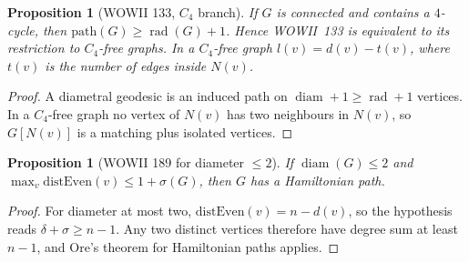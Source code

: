 \documentclass[11pt,a4paper]{article}
\newtheorem{proposition}[theorem]{Proposition}
\theoremstyle{definition}
\newcommand{\rad}{\operatorname{rad}}
\newcommand{\diam}{\operatorname{diam}}
\begin{document}
\begin{proposition}[WOWII 133, $C_4$ branch]
If $G$ is connected and contains a $4$-cycle, then $\mathrm{path}(G)\ge\rad(G)+1$. Hence
WOWII~133 is equivalent to its restriction to $C_4$-free graphs. In a $C_4$-free graph
$l(v)=d(v)-t(v)$, where $t(v)$ is the number of edges inside $N(v)$.
\end{proposition}
\begin{proof}
A diametral geodesic is an induced path on $\diam+1\ge\rad+1$ vertices. In a $C_4$-free
graph no vertex of $N(v)$ has two neighbours in $N(v)$, so $G[N(v)]$ is a matching plus
isolated vertices.
\end{proof}

\begin{proposition}[WOWII 189 for diameter $\le2$]
If $\diam(G)\le2$ and $\max_v\mathrm{distEven}(v)\le1+\sigma(G)$, then $G$ has a Hamiltonian
path.
\end{proposition}
\begin{proof}
For diameter at most two, $\mathrm{distEven}(v)=n-d(v)$, so the hypothesis reads
$\delta+\sigma\ge n-1$. Any two distinct vertices therefore have degree sum at least
$n-1$, and Ore's theorem for Hamiltonian paths applies.
\end{proof}

\end{document}
